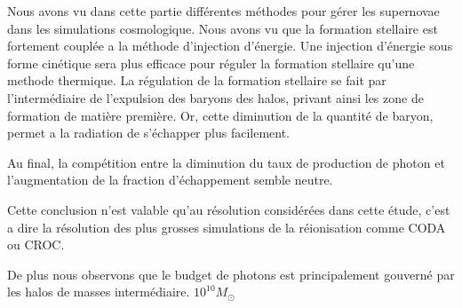 Nous avons vu dans cette partie différentes méthodes pour gérer les supernovae dans les simulations cosmologique.
Nous avons vu que la formation stellaire est fortement couplée a la méthode d'injection d'énergie.
Une injection d'énergie sous forme cinétique sera plus efficace pour réguler la formation stellaire qu'une methode thermique.
La régulation de la formation stellaire se fait par l'intermédiaire de l'expulsion des baryons des halos, privant ainsi les zone de formation de matière première.
Or, cette diminution de la quantité de baryon, permet a la radiation de s'échapper plus facilement.

Au final, la compétition entre la diminution du taux de production de photon et l'augmentation de la fraction d'échappement semble neutre.

Cette conclusion n'est valable qu'au résolution considérées dans cette étude, c'est a dire la résolution des plus grosses simulations de la réionisation comme CODA ou CROC. %



De plus nous observons que le budget de photons est principalement gouverné par les halos de masses intermédiaire. $10^{10} M_\odot$







